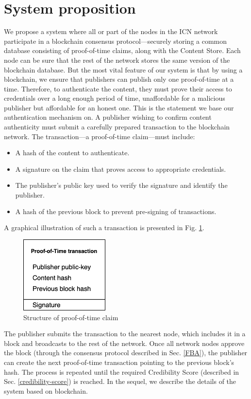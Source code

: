 \section{System proposition}
We propose a system where all or part of the nodes in the ICN network participate in a blockchain consensus protocol––securely storing a common database consisting of proof-of-time claims, along with the Content Store. Each node can be sure that the rest of the network stores the same version of the blockchain database. But the most vital feature of our system is that by using a blockchain, we ensure that publishers can publish only one proof-of-time at a time. Therefore, to authenticate the content, they must prove their access to credentials over a long enough period of time, unaffordable for a malicious publisher but affordable for an honest one. This is the statement we base our authentication mechanism on. A publisher wishing to confirm content authenticity must submit a carefully prepared transaction to the blockchain network. The transaction––a proof-of-time claim––must include:
\begin{itemize}
    \item A hash of the content to authenticate.
    \item A signature on the claim that proves access to appropriate credentials.
    \item The publisher's public key used to verify the signature and identify the publisher.
    \item A hash of the previous block to prevent pre-signing of transactions.
\end{itemize}
A graphical illustration of such a transaction is presented in Fig. \ref{fig:proof-of-time}.
\begin{figure}[h!]
    \centering
    \includegraphics[width=0.4\textwidth]{img/proof-of-time_transaction.png}
    \caption{Structure of proof-of-time claim}
    \label{fig:proof-of-time}
\end{figure}

The publisher submits the transaction to the nearest node, which includes it in a block and broadcasts to the rest of the network. Once all network nodes approve the block (through the consensus protocol described in Sec. \ref{FBA}), the publisher can create the next proof-of-time transaction pointing to the previous block's hash. The process is repeated until the required Credibility Score (described in Sec. \ref{credibility-score}) is reached. In the sequel, we describe the details of the system based on blockchain.

